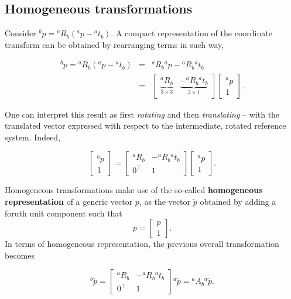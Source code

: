 \documentclass[10pt]{report}
\begin{document}
\subsection{Homogeneous transformations}
\label{sec:org84e2e34}
Consider \({}^b p = {}^aR_b({}^a p - {}^at_b)\). A compact representation of the coordinate transform can be obtained by rearranging terms in such way,

\[\begin{array}{rcl} {}^b p = {}^a R_b ({}^a p - {}^a t_b) & = & {}^a R_b {}^a p - {}^a R_b {}^a t_b \\ & = & \begin{bmatrix} \underbrace{{}^a R_b}_{3 \times 3} & \underbrace{-{}^a R_b{}^a t_b}_{3 \times 1}\end{bmatrix}\begin{bmatrix}{}^a p \\ 1\end{bmatrix}. \end{array}\]

One can interpret this result as first \emph{rotating} and then \emph{translating} -- with the translated vector expressed with respect to the intermediate, rotated reference system. Indeed,

\[\begin{bmatrix}{}^b p \\ 1\end{bmatrix} = \begin{bmatrix} {}^a R_b & - {}^a R_b {}^a t_b \\ 0^\top & 1 \end{bmatrix}\begin{bmatrix} {}^a p \\ 1\end{bmatrix}.\]

Homogeneous transformations make use of the so\--called \textbf{homogeneous representation} of a generic vector \(p\), as the vector \(\tilde p\) obtained by adding a foruth unit component such that $$p = \begin{bmatrix} p \\ 1\end{bmatrix}.$$ In terms of homogeneous representation, the previous overall transformation becomes

\[{}^b \tilde p  = \begin{bmatrix} {}^a R_b & - {}^a R_b {}^a t_b \\ 0^\top & 1 \end{bmatrix}{}^a \tilde p = {}^a A_b {}^a \tilde p.\]
\end{document}
